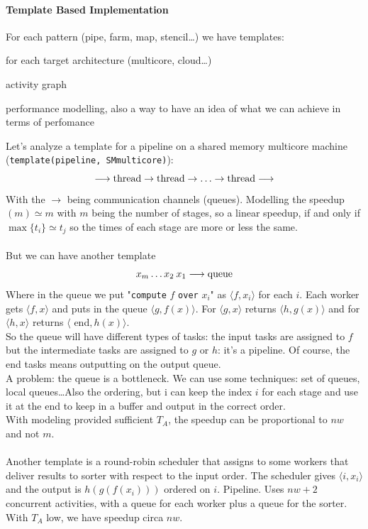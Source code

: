 \documentclass[10pt]{report}
\begin{document}
\paragraph{Template Based Implementation} For each pattern (pipe, farm, map, stencil\ldots) we have templates:\begin{list}{}{}
	\item for each target architecture (multicore, cloud\ldots)
	\item activity graph
	\item performance modelling, also a way to have an idea of what we can achieve in terms of perfomance
\end{list}
Let's analyze a template for a pipeline on a shared memory multicore machine (\texttt{template(pipeline, SMmulticore)}):
$$\longrightarrow\hbox{thread}\rightarrow\hbox{thread}\rightarrow\ldots\rightarrow\hbox{thread}\longrightarrow$$
With the $\rightarrow$ being communication channels (queues). Modelling the speedup$(m)\simeq m$ with $m$ being the number of stages, so a linear speedup, if and only if $\max\{t_i\}\simeq t_j$ so the times of each stage are more or less the same.\\\\
But we can have another template
$$x_m\ldots x_2\:x_1\longrightarrow\hbox{queue}$$
Where in the queue we put "\texttt{compute} $f$ \texttt{over} $x_i$" as $\langle f,x_i\rangle$ for each $i$. Each worker gets $\langle f,x\rangle$ and puts in the queue $\langle g, f(x)\rangle$. For $\langle g,x\rangle$ returns $\langle h,g(x)\rangle$ and for $\langle h,x\rangle$ returns $\langle$ end$,h(x)\rangle$.\\
So the queue will have different types of tasks: the input tasks are assigned to $f$ but the intermediate tasks are assigned to $g$ or $h$: it's a pipeline. Of course, the end tasks means outputting on the output queue.\\
A problem: the queue is a bottleneck. We can use some techniques: set of queues, local queues\ldots Also the ordering, but i can keep the index $i$ for each stage and use it at the end to keep in a buffer and output in the correct order.\\
With modeling provided sufficient $T_A$, the speedup can be proportional to $nw$ and not $m$.\\\\
Another template is a round-robin scheduler that assigns to some workers that deliver results to sorter with respect to the input order. The scheduler gives $\langle i, x_i\rangle$ and the output is $h(g(f(x_i)))$ ordered on $i$. Pipeline. Uses $nw+2$ concurrent activities, with a queue for each worker plus a queue for the sorter. With $T_A$ low, we have speedup circa $nw$.\\\\
\end{document}
